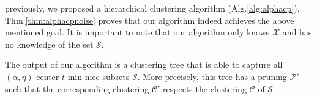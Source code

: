 \documentclass[11pt]{article}
\newcommand{\mc}{\mathcal}
\begin{document}
previously, we proposed a hierarchical clustering algorithm (Alg.\ref{alg:alphacp}). Thm.\ref{thm:alphacpnoise} proves that our algorithm indeed achieves the above mentioned goal.
It is important to note that our algorithm only knows $\mc X$ and has no knowledge of the set $\mc S$.

The output of our algorithm is a clustering tree that is able to capture all $(\alpha, \eta)$-center $t$-min nice subsets $\mc S$. More precisely, this tree has a pruning $\mc P'$ such that the corresponding clustering $\mc C'$ respects the clustering $\mc C$ of $\mc S$. 


\end{document}
